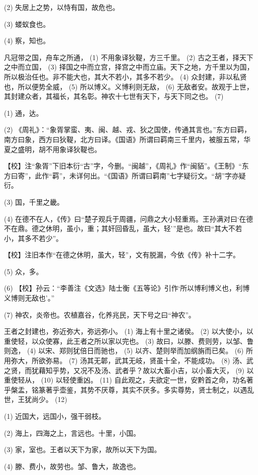 \documentclass[12pt,UTF8]{ctexbook}
\begin{document}
(2) 失居上之势，以恃有国，故危也。

(3) 蝼蚁食也。

(4) 察，知也。

凡冠带之国，舟车之所通， (1) 不用象译狄鞮，方三千里。 (2) 古之王者，择天下之中而立国， (3) 择国之中而立宫，择宫之中而立庙。天下之地，方千里以为国，所以极治任也。非不能大也，其大不若小，其多不若少。 (4) 众封建，非以私贤也，所以便势全威， (5) 所以博义。义博利则无敌， (6) 无敌者安。故观于上世，其封建众者，其福长，其名彰。神农十七世有天下，与天下同之也。 (7)

(1) 通，达。

(2) 《周礼》：“象胥掌蛮、夷、闽、越、戎、狄之国使，传通其言也。”东方曰羁，南方曰象，西方曰狄鞮，北方曰译。《国语》所谓曰羁南三千里内，被服五常，华夏之盛明，胡不用象译狄鞮也。

【校】注“象胥”下旧本衍“古”字，今删。“闽越”，《周礼》作“闽貊”。《王制》“东方曰寄”，此作“羁”，未详何出。“《国语》所谓曰羁南”七字疑衍文。“胡”字亦疑衍。

(3) 国，千里之畿。

(4) 在德不在人，《传》曰“楚子观兵于周疆，问鼎之大小轻重焉。王孙满对曰‘在德不在鼎。德之休明，虽小，重；其奸回昏乱，虽大，轻’”是也。故曰“其大不若小，其多不若少”。

【校】注旧本作“在德之休明，虽大，轻”，文有脱漏，今依《传》补十二字。

(5) 众，多。

(6) 【校】孙云：“李善注《文选》陆士衡《五等论》引作‘所以博利博义也，利博义博则无敌也’。”

(7) 神农，炎帝也。农植嘉谷，化养兆民，天下号之曰“神农”。

王者之封建也，弥近弥大，弥远弥小。 (1) 海上有十里之诸侯。 (2) 以大使小，以重使轻，以众使寡，此王者之所以家以完也。 (3) 故曰，以滕、费则劳，以邹、鲁则逸， (4) 以宋、郑则犹倍日而驰也， (5) 以齐、楚则举而加纲旃而已矣。 (6) 所用弥大，所欲弥易。 (7) 汤其无郼，武其无岐，贤虽十全，不能成功。 (8) 汤、武之贤，而犹藉知乎势，又况不及汤、武者乎？故以大畜小吉，以小畜大灭， (9) 以重使轻从， (10) 以轻使重凶。 (11) 自此观之，夫欲定一世，安黔首之命，功名著乎槃盂，铭篆著乎壶鉴，其势不厌尊，其实不厌多。多实尊势，贤士制之，以遇乱世，王犹尚少。 (12)

(1) 近国大，远国小，强干弱枝。

(2) 海上，四海之上，言远也。十里，小国。

(3) 家，室也。王者以天下为家，故所以天下为国。

(4) 滕、费小，故劳也。邹、鲁大，故逸也。
\end{document}
